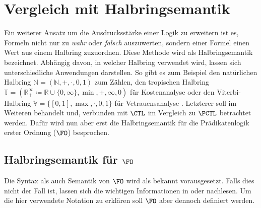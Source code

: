 \section{Vergleich mit Halbringsemantik}

Ein weiterer Ansatz um die Ausdrucksstärke einer Logik zu erweitern ist es, Formeln nicht nur zu \textit{wahr} oder \textit{falsch} auszuwerten, sondern einer Formel einen Wert aus einem Halbring zuzuordnen.
Diese Methode wird als Halbringsemantik bezeichnet.
Abhängig davon, in welcher Halbring verwendet wird, lassen sich unterschiedliche Anwendungen darstellen. 
So gibt es zum Beispiel den natürlichen Halbring $\mathbb{N}=(\mathbb{N},+,\cdot,0,1)$ zum Zählen, den tropischen Halbring $\mathbb{T}=(\mathbb{R}^\infty_+\coloneqq\mathbb{R} \cup \{0,\infty\},\min,+,\infty,0)$ für Kostenanalyse oder den Viterbi-Halbring $\mathbb{V}=\{[0,1],\max,\cdot,0,1\}$ für Vetrauensanalyse \cite{dannert2019provenance}.
Letzterer soll im Weiteren behandelt und, verbunden mit $\CTL$ im Vergleich zu $\PCTL$ betrachtet werden.
Dafür wird nun aber erst die Halbringsemantik für die Prädikatenlogik erster Ordnung ($\FO$) besprochen.

\subsection{Halbringsemantik für $\FO$}
\label{ChapHalbringFO}

Die Syntax als auch Semantik von $\FO$ wird als bekannt vorausgesetzt.
Falls dies nicht der Fall ist, lassen sich die wichtigen Informationen in \cite{barwise1977introduction} oder \cite{ebbinghaus1994mathematical} nachlesen.
Um die hier verwendete Notation zu erklären soll $\FO$ aber dennoch definiert werden.

